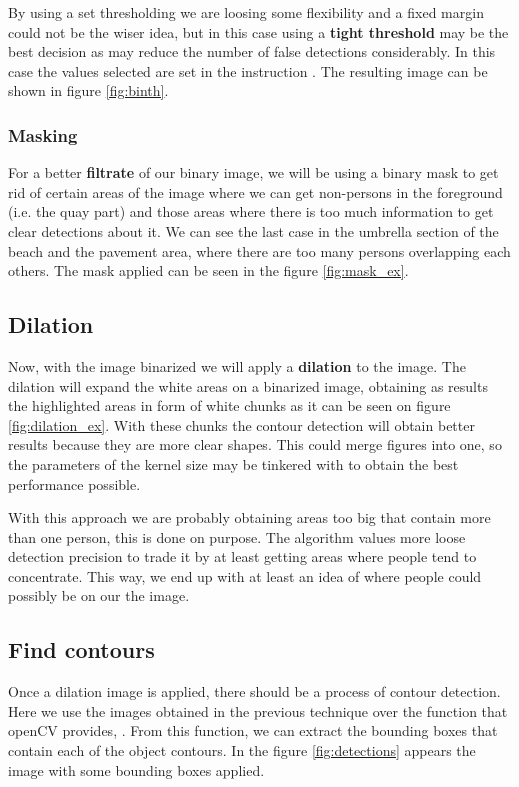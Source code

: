 \documentclass[10pt]{article}
\begin{document}
By using a set thresholding we are loosing some flexibility and a fixed margin could not be the wiser idea, but in this case using a \textbf{tight threshold} may be the best decision as may reduce the number of false detections considerably. In this case the values selected are set in the instruction . The resulting image can be shown in figure \ref{fig:binth}.



\subsubsection*{Masking}
For a better \textbf{filtrate} of our binary image, we will be using a binary mask to get rid of certain areas of the image where we can get non-persons in the foreground (i.e. the quay part) and those areas where there is too much information to get clear detections about it. We can see the last case in the umbrella section of the beach and the pavement area, where there are too many persons overlapping each others. The mask applied can be seen in the figure \ref{fig:mask_ex}.

\subsection{Dilation}
Now, with the image binarized we will apply a \textbf{dilation} to the image. The dilation will expand the white areas on a binarized image, obtaining as results the highlighted areas in form of white chunks as it can be seen on figure \ref{fig:dilation_ex}. With these chunks the contour detection will obtain better results because they are more clear shapes. This could merge figures into one, so the parameters of the kernel size may be tinkered with to obtain the best performance possible.\medskip

With this approach we are probably obtaining areas too big that contain more than one person, this is done on purpose. The algorithm values more loose detection precision to trade it by at least getting areas where people tend to concentrate. This way, we end up with at least an idea of where people could possibly be on our the image.

\subsection{Find contours}
Once a dilation image is applied, there should be a process of contour detection. Here we use the images obtained in the previous technique over the function that openCV provides, . From this function, we can extract the bounding boxes that contain each of the object contours. In the figure \ref{fig:detections} appears the image with some bounding boxes applied.
\end{document}
